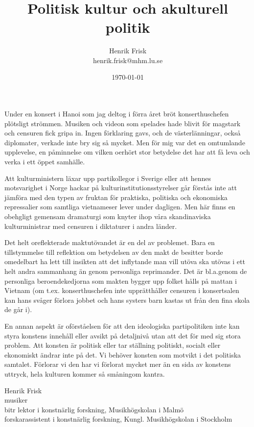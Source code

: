 \documentclass[a4paper]{article}
\title{Politisk kultur och akulturell politik}
\author{Henrik Frisk\\{\small henrik.frisk@mhm.lu.se}}
\date{\today}
\begin{document}
\maketitle

\thispagestyle{empty}

Under en konsert i Hanoi som jag deltog i förra året bröt konserthuschefen plötsligt strömmen. Musiken och videon som spelades hade blivit för magstark och censuren fick gripa in. Ingen förklaring gavs, och de västerlänningar, också diplomater, verkade inte bry sig så mycket. Men för mig var det en omtumlande upplevelse, en påminnelse om vilken oerhört stor betydelse det har att få leva och verka i ett öppet samhälle.

Att kulturministern läxar upp partikollegor i Sverige eller att hennes motsvarighet i Norge hackar på kulturinstitutionsstyrelser går förstås inte att jämföra med den typen av fruktan för praktiska, politiska och ekonomiska repressalier som samtliga vietnameser lever under dagligen. Men här finns en obehgligt gemensam dramaturgi som knyter ihop våra skandinaviska kulturministrar med censuren i diktaturer i andra länder.

Det helt oreflekterade maktutövandet är en del av problemet. Bara en tillstymmelse till reflektion om betydelsen av den makt de besitter borde omedelbart ha lett till insikten att det inflytande man vill utöva ska utövas i ett helt andra sammanhang än genom personliga reprimander. Det är bl.a.genom de personliga beroendekedjorna som makten bygger upp folket hålls på mattan i Vietnam (om t.ex. konserthuschefen inte upprätthåller censuren i konsertsalen kan hans svåger förlora jobbet och hans systers barn kastas ut från den fina skola de går i).

En annan aspekt är oförståelsen för att den ideologiska partipolitiken inte kan styra konstens innehåll eller avsikt på detaljnivå utan att det för med sig stora problem. Att konsten är politisk eller tar ställning politiskt, socialt eller ekonomiskt ändrar inte på det. Vi behöver konsten som motvikt i det politiska samtalet. Förlorar vi den har vi förlorat mycket mer än en sida av konstens uttryck, hela kulturen kommer så småningom kantra.

Henrik Frisk\\
musiker\\
bitr lektor i konstnärlig forskning, Musikhögskolan i Malmö\\
forskarassistent i konstnärlig forskning, Kungl. Musikhögskolan i Stockholm
\end{document}
